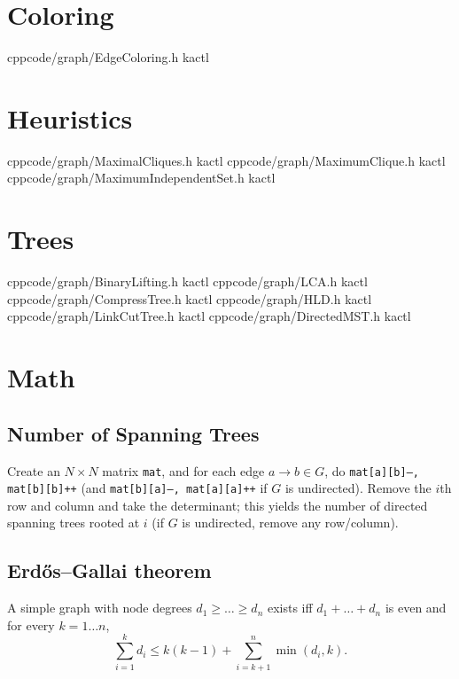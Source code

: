 \section{Coloring}
    {}{}
    {cpp}{code/graph/EdgeColoring.h}
    {kactl}

\section{Heuristics}
    {}{}
    {cpp}{code/graph/MaximalCliques.h}
    {kactl}
    {}{}
    {cpp}{code/graph/MaximumClique.h}
    {kactl}
    {}{}
    {cpp}{code/graph/MaximumIndependentSet.h}
    {kactl}

\section{Trees}
    {}{}
    {cpp}{code/graph/BinaryLifting.h}
    {kactl}
    {}{}
    {cpp}{code/graph/LCA.h}
    {kactl}
    {}{}
    {cpp}{code/graph/CompressTree.h}
    {kactl}
    {}{}
    {cpp}{code/graph/HLD.h}
    {kactl}
    {}{}
    {cpp}{code/graph/LinkCutTree.h}
    {kactl}
    {}{}
    {cpp}{code/graph/DirectedMST.h}
    {kactl}

\section{Math}
	\subsection{Number of Spanning Trees}
		Create an $N\times N$ matrix \texttt{mat}, and for each edge $a \rightarrow b \in G$, do
		\texttt{mat[a][b]--, mat[b][b]++} (and \texttt{mat[b][a]--, mat[a][a]++} if $G$ is undirected).
		Remove the $i$th row and column and take the determinant; this yields the number of directed spanning trees rooted at $i$
		(if $G$ is undirected, remove any row/column).

	\subsection{Erdős–Gallai theorem}
		A simple graph with node degrees $d_1 \ge \dots \ge d_n$ exists iff $d_1 + \dots + d_n$ is even and for every $k = 1\dots n$,
		\[ \sum _{i=1}^{k}d_{i}\leq k(k-1)+\sum _{i=k+1}^{n}\min(d_{i},k). \]
